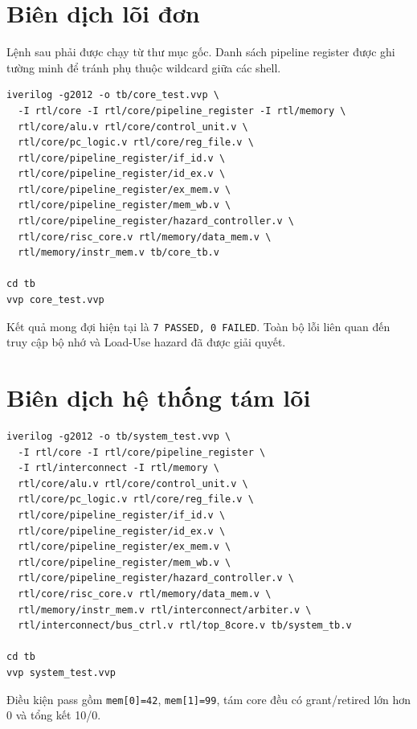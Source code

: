 \section{Biên dịch lõi đơn}

Lệnh sau phải được chạy từ thư mục gốc. Danh sách pipeline register được ghi tường minh để tránh phụ thuộc wildcard giữa các shell.

\begin{lstlisting}[language={},numbers=none,caption={Build và chạy \texttt{core\_tb}},label={lst:build_core_full}]
iverilog -g2012 -o tb/core_test.vvp \
  -I rtl/core -I rtl/core/pipeline_register -I rtl/memory \
  rtl/core/alu.v rtl/core/control_unit.v \
  rtl/core/pc_logic.v rtl/core/reg_file.v \
  rtl/core/pipeline_register/if_id.v \
  rtl/core/pipeline_register/id_ex.v \
  rtl/core/pipeline_register/ex_mem.v \
  rtl/core/pipeline_register/mem_wb.v \
  rtl/core/pipeline_register/hazard_controller.v \
  rtl/core/risc_core.v rtl/memory/data_mem.v \
  rtl/memory/instr_mem.v tb/core_tb.v

cd tb
vvp core_test.vvp
\end{lstlisting}

Kết quả mong đợi hiện tại là \texttt{7 PASSED, 0 FAILED}. Toàn bộ lỗi liên quan đến truy cập bộ nhớ và Load-Use hazard đã được giải quyết.

\section{Biên dịch hệ thống tám lõi}

\begin{lstlisting}[language={},numbers=none,caption={Build và chạy \texttt{system\_tb}},label={lst:build_system_full}]
iverilog -g2012 -o tb/system_test.vvp \
  -I rtl/core -I rtl/core/pipeline_register \
  -I rtl/interconnect -I rtl/memory \
  rtl/core/alu.v rtl/core/control_unit.v \
  rtl/core/pc_logic.v rtl/core/reg_file.v \
  rtl/core/pipeline_register/if_id.v \
  rtl/core/pipeline_register/id_ex.v \
  rtl/core/pipeline_register/ex_mem.v \
  rtl/core/pipeline_register/mem_wb.v \
  rtl/core/pipeline_register/hazard_controller.v \
  rtl/core/risc_core.v rtl/memory/data_mem.v \
  rtl/memory/instr_mem.v rtl/interconnect/arbiter.v \
  rtl/interconnect/bus_ctrl.v rtl/top_8core.v tb/system_tb.v

cd tb
vvp system_test.vvp
\end{lstlisting}

Điều kiện pass gồm \texttt{mem[0]=42}, \texttt{mem[1]=99}, tám core đều có grant/retired lớn hơn 0 và tổng kết 10/0.

